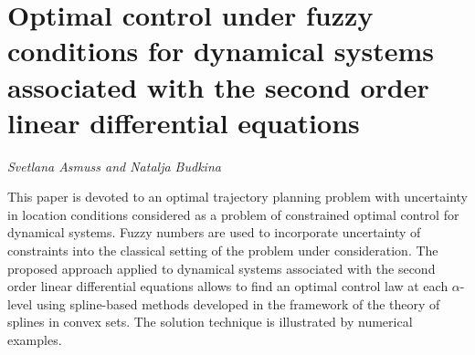 \documentclass[../booklet.tex]{subfiles}
\begin{document}
\section[Optimal control under fuzzy conditions for dynamical systems associated with the second order linear differential equations. {\it Svetlana Asmuss and Natalja Budkina}]{Optimal control under fuzzy conditions for dynamical systems associated with the second order linear differential equations}
 

\begin{center}
  {\it Svetlana Asmuss and Natalja Budkina}
\end{center}

\vskip 0.8cm


This paper is devoted to an optimal trajectory planning problem with uncertainty in location conditions considered as a problem of constrained optimal control for dynamical systems. Fuzzy numbers are used to incorporate uncertainty of constraints into the classical setting of the problem under consideration. The proposed approach applied to dynamical systems associated with the second order linear differential equations allows to find an optimal control law at each $\alpha$-level using spline-based methods developed in the framework of the theory of splines in convex sets. The solution technique is illustrated by numerical examples. 

\end{document}

